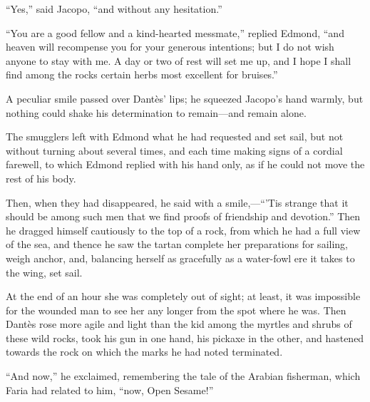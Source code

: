 “Yes,” said Jacopo, “and without any hesitation.”

“You are a good fellow and a kind-hearted messmate,” replied Edmond,
“and heaven will recompense you for your generous intentions; but I do
not wish anyone to stay with me. A day or two of rest will set me up,
and I hope I shall find among the rocks certain herbs most excellent
for bruises.”

A peculiar smile passed over Dantès’ lips; he squeezed Jacopo’s hand
warmly, but nothing could shake his determination to remain—and remain
alone.

The smugglers left with Edmond what he had requested and set sail, but
not without turning about several times, and each time making signs of
a cordial farewell, to which Edmond replied with his hand only, as if
he could not move the rest of his body.

Then, when they had disappeared, he said with a smile,—“’Tis strange
that it should be among such men that we find proofs of friendship and
devotion.” Then he dragged himself cautiously to the top of a rock,
from which he had a full view of the sea, and thence he saw the tartan
complete her preparations for sailing, weigh anchor, and, balancing
herself as gracefully as a water-fowl ere it takes to the wing, set
sail.

At the end of an hour she was completely out of sight; at least, it was
impossible for the wounded man to see her any longer from the spot
where he was. Then Dantès rose more agile and light than the kid among
the myrtles and shrubs of these wild rocks, took his gun in one hand,
his pickaxe in the other, and hastened towards the rock on which the
marks he had noted terminated.

“And now,” he exclaimed, remembering the tale of the Arabian fisherman,
which Faria had related to him, “now, Open Sesame!”
